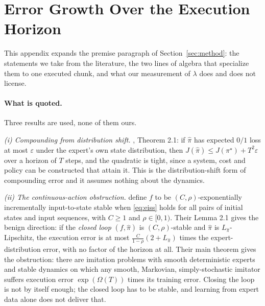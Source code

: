 
\appendix

\section{Error Growth Over the Execution Horizon}
\label{app:theory}

This appendix expands the premise paragraph of Section~\ref{sec:method}: the
statements we take from the literature, the two lines of algebra that specialize
them to one executed chunk, and what our measurement of $\lambda$ does and does
not license.

\paragraph{What is quoted.}
Three results are used, none of them ours.

\emph{(i) Compounding from distribution shift.} \citet{ross2010efficient},
Theorem 2.1:
if $\hat\pi$ has expected $0/1$ loss at most $\varepsilon$ under the expert's
own state distribution, then $J(\hat\pi) \le J(\pi^\star) + T^2\varepsilon$ over
a horizon of $T$ steps, and the quadratic is tight, since a system, cost and
policy can be constructed that attain it. This is the distribution-shift form of
compounding error and it assumes nothing about the dynamics.

\emph{(ii) The continuous-action obstruction.}
\citet{simchowitz2025pitfalls} define $f$ to be $(C,\rho)$-exponentially
incrementally input-to-state stable when \eqref{eq:eiss} holds for all pairs of
initial states and input sequences, with $C\ge 1$ and $\rho \in [0,1)$. Their
Lemma 2.1 gives the benign direction: if the \emph{closed loop} $(f,\hat\pi)$ is
$(C,\rho)$-stable and $\hat\pi$ is $L_{\hat\pi}$-Lipschitz, the execution error
is at most $\frac{C}{1-\rho}(2+L_{\hat\pi})$ times the expert-distribution
error, with no factor of the horizon at all. Their main theorem gives the
obstruction: there are imitation problems with smooth deterministic experts and
stable dynamics on which any smooth, Markovian, simply-stochastic imitator
suffers execution error $\exp(\Omega(T))$ times its training error. Closing the
loop is not by itself enough; the closed loop has to be stable, and learning
from expert data alone does not deliver that.

